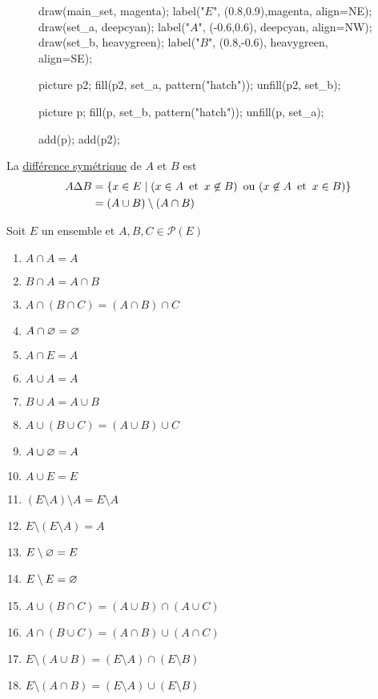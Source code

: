 \begin{defn}
\begin{enumerate}
\begin{minipage}
\begin{wrapfigure}{r}{3cm}
\begin{asy}
						draw(main_set, magenta); label("$E$", (0.8,0.9),magenta, align=NE);
						draw(set_a, deepcyan); label("$A$", (-0.6,0.6), deepcyan, align=NW);
						draw(set_b, heavygreen); label("$B$", (0.8,-0.6), heavygreen, align=SE);

						picture p2;
						fill(p2, set_a, pattern("hatch"));
						unfill(p2, set_b);

						picture p;
						fill(p, set_b, pattern("hatch"));
						unfill(p, set_a);

						add(p);
						add(p2);
					\end{asy}
				\end{wrapfigure}
				La \underline{différence symétrique} de $A$ et $B$ est
				\begin{align*}
					A \Delta B &= \left\{ x \in E  \mid (x \in A\operatorname{\text{ et }} x \not\in B)\operatorname{\text{ ou }}(x\not\in A\operatorname{\text{ et }} x \in B) \right\}\\
					&= (A\cup B)\setminus(A\cap B) \\
				\end{align*}
			\end{minipage}
	\end{enumerate}
\end{defn}

\begin{prop}
	Soit $E$ un ensemble et $A,B,C \in \mathcal{P}(E)$
	
	\begin{multicols}{2}
		\begin{enumerate}
			\item $A\cap A = A$
			\item $B \cap A = A\cap B$ 
			\item $A \cap (B\cap C) = (A\cap B)\cap C$ 
			\item $A \cap \varnothing = \varnothing$ 
			\item $A\cap E = A$ 
			\item $A \cup A = A$ 
			\item $B \cup A = A\cup B$ 
			\item $A \cup (B\cup C) = (A\cup B) \cup C$
			\item $A \cup \varnothing = A$ 
			\item $A\cup E = E$ 
			\item $(E\setminus A)\setminus A = E\setminus A$
			\item $E \setminus(E\setminus A) = A$
			\item $E\setminus\varnothing = E$ 
			\item $E\setminus E = \varnothing$ 
			\item $A \cup (B \cap C) = (A\cup B) \cap (A \cup C)$
			\item $A \cap (B \cup C) = (A\cap B) \cup (A \cap C)$
			\item $E \setminus (A\cup B) = (E\setminus A) \cap (E\setminus B)$
			\item $E \setminus (A \cap B) = (E\setminus A) \cup  (E\setminus B)$
		\end{enumerate}
	\end{multicols}
\end{prop}

